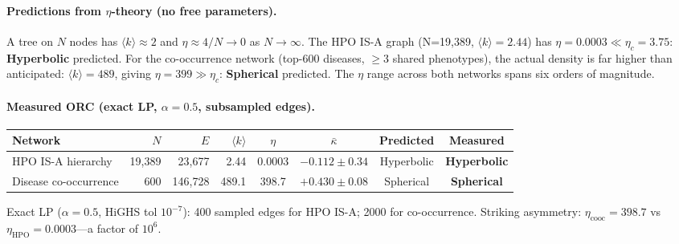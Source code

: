 \documentclass[11pt,a4paper]{article}
\newcommand{\kbar}{\bar{\kappa}}
\begin{document}
\paragraph{Predictions from $\eta$-theory (no free parameters).}
A tree on $N$ nodes has $\langle k \rangle \approx 2$ and $\eta \approx 4/N \to 0$ as $N \to \infty$. The HPO IS-A graph (N=19,389, $\langle k \rangle=2.44$) has $\eta = 0.0003 \ll \eta_c = 3.75$: \textbf{Hyperbolic} predicted. For the co-occurrence network (top-600 diseases, $\geq 3$ shared phenotypes), the actual density is far higher than anticipated: $\langle k \rangle = 489$, giving $\eta = 399 \gg \eta_c$: \textbf{Spherical} predicted. The $\eta$ range across both networks spans six orders of magnitude.

\paragraph{Measured ORC (exact LP, $\alpha=0.5$, subsampled edges).}
\begin{center}
\small
\begin{tabular}{@{}lrrrcccc@{}}
\toprule
Network & $N$ & $E$ & $\langle k \rangle$ & $\eta$ & $\kbar$ & Predicted & Measured \\
\midrule
HPO IS-A hierarchy    & 19,389 & 23,677 & 2.44  & 0.0003  & $-0.112\pm0.34$ & Hyperbolic & \textbf{Hyperbolic} \\
Disease co-occurrence & 600    & 146,728 & 489.1 & 398.7  & $+0.430\pm0.08$ & Spherical  & \textbf{Spherical}  \\
\bottomrule
\end{tabular}
\end{center}
\noindent Exact LP ($\alpha=0.5$, HiGHS tol $10^{-7}$): 400 sampled edges for HPO IS-A; 2000 for co-occurrence. Striking asymmetry: $\eta_{\text{cooc}} = 398.7$ vs $\eta_{\text{HPO}} = 0.0003$---a factor of $10^6$.
\end{document}

